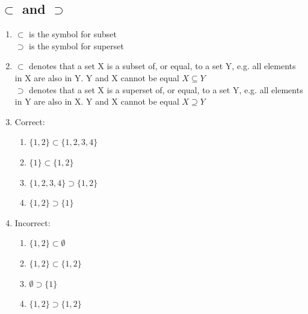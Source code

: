 \documentclass{article}
\begin{document}
\subsection{$\subset$ and $\supset$}
\begin{enumerate}
    \item $\subset$ is the symbol for subset \\
          $\supset$ is the symbol for superset
    \item $\subset$ denotes that a set X is a subset of, or equal, to a set Y, e.g. all elements in X are also in Y. Y and X cannot be equal $X \subseteq Y$ \\
          $\supset$ denotes that a set X is a superset of, or equal, to a set Y, e.g. all elements in Y are also in X. Y and X cannot be equal $X \supseteq Y$
    \item Correct:
    \begin{enumerate}
        \item $\{1, 2\} \subset \{1, 2, 3, 4\}$
        \item $\{1\} \subset \{1, 2\}$
        \item $\{1, 2, 3, 4\} \supset \{1, 2\}$
        \item $\{1, 2\} \supset \{1\}$
    \end{enumerate}
    \item Incorrect:
    \begin{enumerate}
        \item $\{1, 2\} \subset \emptyset$
        \item $\{1, 2\} \subset \{1, 2\}$
        \item $\emptyset \supset \{1\}$
        \item $\{1, 2\} \supset \{1, 2\}$
    \end{enumerate}
\end{enumerate}
\end{document}
